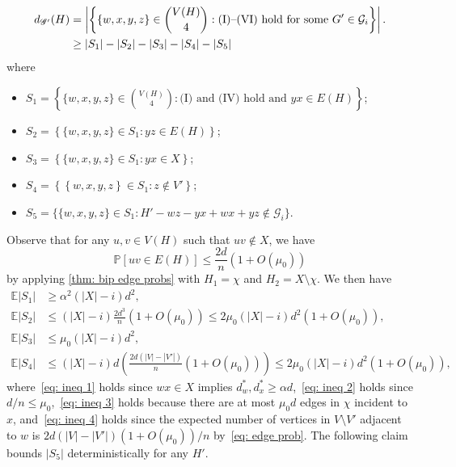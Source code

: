 \documentclass[11pt]{article}
\def\P{\mathbb P}
\theoremstyle{plain}
\begin{document}
    \begin{align}
        d_{\mathscr{G}'}(H) 
        &= \left|\left\{\{w,x,y,z\} \in \binom{V(H)}{4} \mathrel : \text{(I)--(VI) hold for some $G'\in {\mathcal G}_{i}$}\right\}\right|.\notag\\
        &\geq |S_1| - |S_2| - |S_3| - |S_4| - |S_5|\label{eq: dR(H)}
    \end{align}
    where 
    \begin{itemize}
        \item $S_1 = \left\{\{w,x,y,z\} \in \binom{V(H)}{4} \mathrel : \text{(I) and (IV) hold and $yx \in E(H)$}\right\}$;
        \item $S_2 = \left\{\{w,x,y,z\} \in S_1 \mathrel : yz \in E(H)\right\}$;
        \item $S_3 = \left\{ \{w,x,y,z\} \in S_1 \mathrel : yx \in X \right\}$;
        \item $S_4 = \left\{ \left\{w,x,y,z\right\} \in S_1 \mathrel : z \notin V' \right\}$;
        \item $S_5 = \{\{w,x,y,z\} \in S_1 \mathrel : H' - wz - yx + wx + yz \notin \mathcal G_i\}$.
    \end{itemize}
    Observe that for any $u, v \in V(H)$ such that $uv \notin X$, we have 
    \begin{equation}\label{eq: edge prob}
        \P[uv \in E(H)] \leq \frac{2d}{n}(1 +O(\mu_0))
    \end{equation}
    by applying \cref{thm: bip edge probs} with $H_1 = \chi$ and $H_2 = X \setminus \chi$. We then have
    \begin{align}
        \mathbb E|S_1| &\geq \alpha^2(|X| - i)d^2, \label{eq: ineq 1}\\
        \mathbb E |S_2| &\leq (|X| - i)\frac{2d^3}{n}(1 + O(\mu_0)) \leq 2\mu_0(|X| - i)d^2(1 + O(\mu_0)),\label{eq: ineq 2}\\
        \mathbb E|S_3| &\leq \mu_0(|X| - i)d^2, \label{eq: ineq 3}\\
        \mathbb E |S_4| &\leq (|X| - i)d\left(\frac{2d(|V| - |V'|)}{n}(1 + O(\mu_0))\right) \leq 2\mu_0(|X| - i)d^2(1 + O(\mu_0)),\label{eq: ineq 4}
    \end{align}
    where~\eqref{eq: ineq 1} holds since $wx \in X$ implies $d^*_w, d^*_x \geq \alpha d$,~\eqref{eq: ineq 2} holds since $d/n \leq \mu_0$,~\eqref{eq: ineq 3} holds because there are at most $\mu_0d$ edges in $\chi$ incident to $x$, and~\eqref{eq: ineq 4} holds since the expected number of vertices in $V \setminus V'$ adjacent to $w$ is $2d(|V| - |V'|)(1 + O(\mu_0))/n$ by~\eqref{eq: edge prob}.
    The following claim bounds $|S_5|$ deterministically for any $H'$.
\end{document}
